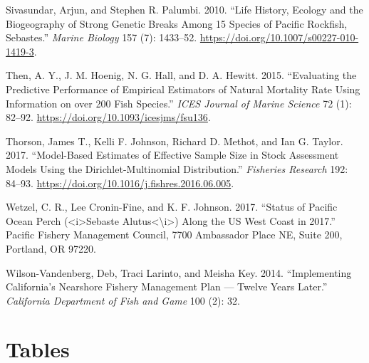 \documentclass[11pt,
  english,
  a4paper,
]{article}
\begin{document}
\begin{cslreferences}
\leavevmode\hypertarget{ref-sivasundar_life_2010}{}%
Sivasundar, Arjun, and Stephen R. Palumbi. 2010. ``Life History, Ecology and the Biogeography of Strong Genetic Breaks Among 15 Species of Pacific Rockfish, Sebastes.'' \emph{Marine Biology} 157 (7): 1433--52. \url{https://doi.org/10.1007/s00227-010-1419-3}.

\leavevmode\hypertarget{ref-then_evaluating_2015}{}%
Then, A. Y., J. M. Hoenig, N. G. Hall, and D. A. Hewitt. 2015. ``Evaluating the Predictive Performance of Empirical Estimators of Natural Mortality Rate Using Information on over 200 Fish Species.'' \emph{ICES Journal of Marine Science} 72 (1): 82--92. \url{https://doi.org/10.1093/icesjms/fsu136}.

\leavevmode\hypertarget{ref-thorson_model-based_2017}{}%
Thorson, James T., Kelli F. Johnson, Richard D. Methot, and Ian G. Taylor. 2017. ``Model-Based Estimates of Effective Sample Size in Stock Assessment Models Using the Dirichlet-Multinomial Distribution.'' \emph{Fisheries Research} 192: 84--93. \url{https://doi.org/10.1016/j.fishres.2016.06.005}.

\leavevmode\hypertarget{ref-wetzel_status_2017}{}%
Wetzel, C. R., Lee Cronin-Fine, and K. F. Johnson. 2017. ``Status of Pacific Ocean Perch (\textless i\textgreater Sebaste Alutus\textless\textbackslash i\textgreater) Along the US West Coast in 2017.'' Pacific Fishery Management Council, 7700 Ambassador Place NE, Suite 200, Portland, OR 97220.

\leavevmode\hypertarget{ref-wilson-vandenberg_implementing_2014}{}%
Wilson-Vandenberg, Deb, Traci Larinto, and Meisha Key. 2014. ``Implementing California's Nearshore Fishery Management Plan --- Twelve Years Later.'' \emph{California Department of Fish and Game} 100 (2): 32.
\end{cslreferences}

\leavevmode\tagmcend\tagstructend

\clearpage


\hypertarget{tables}{%
\section{Tables}\label{tables}}

\leavevmode\tagmcend\tagstructend



\newpage

\begingroup\fontsize{10}{12}\selectfont
\end{document}
